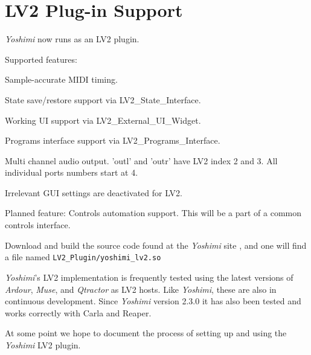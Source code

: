 %
%
%

\section{LV2 Plug-in Support}
\label{sec:lv2_plugin}

   \textsl{Yoshimi} now runs as an LV2 plugin.

Supported features:

   \begin{enumber}
      \item Sample-accurate MIDI timing.
      \item State save/restore support via LV2\_State\_Interface.
      \item Working UI support via LV2\_External\_UI\_Widget.
      \item Programs interface support via LV2\_Programs\_Interface.
      \item Multi channel audio output. 'outl' and 'outr' have LV2 index 2
         and 3. All individual ports numbers start at 4.
      \item Irrelevant GUI settings are deactivated for LV2.
   \end{enumber}

   Planned feature: Controls automation support. This will be a part of a
   common controls interface.

   Download and build the source code found at the
   \textsl{Yoshimi} site \cite{yoshimi},
   and one will find a file named
   \texttt{LV2\_Plugin/yoshimi\_lv2.so}

   \textsl{Yoshimi}'s LV2 implementation is frequently tested using the latest
   versions of \textsl{Ardour}, \textsl{Muse}, and \textsl{Qtractor} as LV2
   hosts. Like \textsl{Yoshimi}, these are also in continuous development. Since
   \textsl{Yoshimi} version 2.3.0 it has also been tested and works correctly
   with Carla and Reaper.

   At some point we hope to document the process of setting up and using
   the \textsl{Yoshimi} LV2 plugin.

